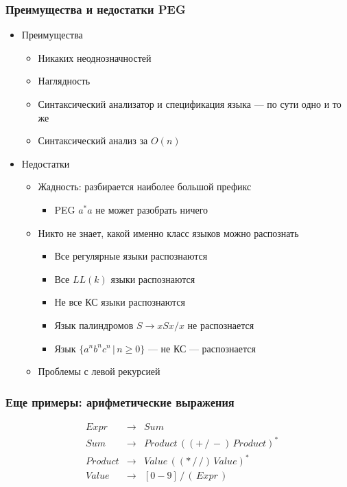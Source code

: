 \documentclass{beamer}
\begin{document}
\begin{frame}[fragile]
  \transwipe[direction=90]
  \frametitle{Преимущества и недостатки PEG}
  \begin{itemize}
    \item Преимущества
    \begin{itemize}
      \item Никаких неоднозначностей
      \item Наглядность
      \item Синтаксический анализатор и спецификация языка --- по сути одно и то же
      \item Синтаксический анализ за $O(n)$
    \end{itemize}
    \item Недостатки
    \begin{itemize}
      \item Жадность: разбирается наиболее большой префикс
      \begin{itemize}
        \item PEG $a^* a$ не может разобрать ничего
      \end{itemize}
      \item Никто не знает, какой именно класс языков можно распознать
      \begin{itemize}
        \item Все регулярные языки распознаются
        \item Все $LL(k)$ языки распознаются
        \item Не все КС языки распознаются
        \item Язык палиндромов $S \rightarrow x S x / x$ не распознается
        \item Язык $\{ a^n b^n c^n \, | \, n \geq 0 \}$ --- не КС --- распознается 
      \end{itemize}
	  \item Проблемы с левой рекурсией
    \end{itemize}
  \end{itemize}
\end{frame}

\begin{frame}[fragile]
  \transwipe[direction=90]
  \frametitle{Еще примеры: арифметические выражения}
  $$
  \begin{array}{crcl}
  &Expr  & \rightarrow & Sum \\
  &Sum & \rightarrow & Product \, ((+ \, / \, -) \, Product)^* \\
  &Product  & \rightarrow & Value \, ((* \, / \, /) \, Value)^* \\
  &Value & \rightarrow & [0-9] \, / \, ( \, Expr \, )
  \end{array}
  $$ 
\end{frame}
\end{document}
